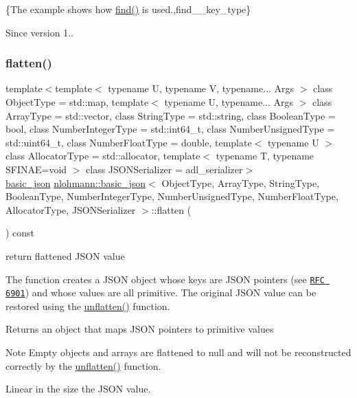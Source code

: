 \{The example shows how {\ttfamily \mbox{\hyperlink{classnlohmann_1_1basic__json_aeed33787bd362c7ead59a4ba945392db}{find()}}} is used.,find\+\_\+\+\_\+key\+\_\+type\}

\begin{DoxySince}{Since}
version 1.. 
\end{DoxySince}
\mbox{\label{classnlohmann_1_1basic__json_ab838f000d76662917ffd6ec529569e03}} 
\subsubsection{\texorpdfstring{flatten()}{flatten()}}
{\footnotesize\ttfamily template$<$template$<$ typename U, typename V, typename... Args $>$ class Object\+Type = std\+::map, template$<$ typename U, typename... Args $>$ class Array\+Type = std\+::vector, class String\+Type  = std\+::string, class Boolean\+Type  = bool, class Number\+Integer\+Type  = std\+::int64\+\_\+t, class Number\+Unsigned\+Type  = std\+::uint64\+\_\+t, class Number\+Float\+Type  = double, template$<$ typename U $>$ class Allocator\+Type = std\+::allocator, template$<$ typename T, typename S\+F\+I\+N\+A\+E=void $>$ class J\+S\+O\+N\+Serializer = adl\+\_\+serializer$>$ \\
\mbox{\hyperlink{classnlohmann_1_1basic__json}{basic\+\_\+json}} \mbox{\hyperlink{classnlohmann_1_1basic__json}{nlohmann\+::basic\+\_\+json}}$<$ Object\+Type, Array\+Type, String\+Type, Boolean\+Type, Number\+Integer\+Type, Number\+Unsigned\+Type, Number\+Float\+Type, Allocator\+Type, J\+S\+O\+N\+Serializer $>$\+::flatten (\begin{DoxyParamCaption}{ }\end{DoxyParamCaption}) const\hspace{0.3cm}{\ttfamily [inline]}}



return flattened J\+S\+ON value 

The function creates a J\+S\+ON object whose keys are J\+S\+ON pointers (see \href{https://tools.ietf.org/html/rfc6901}{\tt R\+FC 6901}) and whose values are all primitive. The original J\+S\+ON value can be restored using the \mbox{\hyperlink{classnlohmann_1_1basic__json_a74fa3ab2003f2f6f2b69deaafed9126d}{unflatten()}} function.

\begin{DoxyReturn}{Returns}
an object that maps J\+S\+ON pointers to primitive values
\end{DoxyReturn}
\begin{DoxyNote}{Note}
Empty objects and arrays are flattened to {\ttfamily null} and will not be reconstructed correctly by the \mbox{\hyperlink{classnlohmann_1_1basic__json_a74fa3ab2003f2f6f2b69deaafed9126d}{unflatten()}} function.
\end{DoxyNote}
Linear in the size the J\+S\+ON value.


